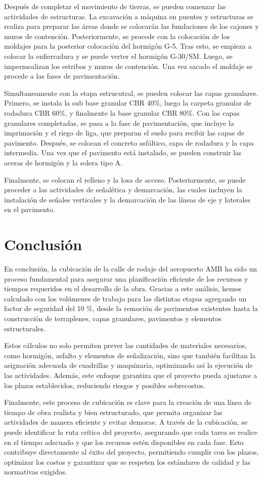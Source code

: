 \documentclass{article} %
\begin{document}
Después de completar el movimiento de tierras, se pueden comenzar las actividades de estructuras. La excavación a máquina en puentes y estructuras se realiza para preparar las áreas donde se colocarán las fundaciones de los cajones y muros de contención. Posteriormente, se procede con la colocación de los moldajes para la posterior colocación del hormigón G-5. Tras esto, se empieza a colocar la enfierradura y se puede verter el hormigón G-30/SM. Luego, se impermealizan los estribos y muros de contención. Una vez sacado el moldaje se procede a las fases de pavimentación.

Simultaneamente con la etapa estrucutral, se pueden colocar las capas granulares. Primero, se instala la sub base granular CBR 40\%, luego la carpeta granular de rodadura CBR 60\%, y finalmente la base granular CBR 80\%. Con las capas granulares completadas, se pasa a la fase de pavimentación, que incluye la imprimación y el riego de liga, que preparan el suelo para recibir las capas de pavimento. Después, se colocan el concreto asfáltico, capa de rodadura y la capa intermedia. Una vez que el pavimento está instalado, se pueden construir las aceras de hormigón y la solera tipo A.

Finalmente, se colocan el relleno y la losa de acceso. Posteriormente, se puede proceder a las actividades de señalética y demarcación, las cuales incluyen la instalación de señales verticales y la demarcación de las líneas de eje y laterales en el pavimento.

\newpage
\section{Conclusión}

En conclusión, la cubicación de la calle de rodaje del aeropuerto AMB ha sido un proceso fundamental para asegurar una planificación eficiente de los recursos y tiempos requeridos en el desarrollo de la obra. Gracias a este análisis, hemos calculado con los volúmenes de trabajo para las distintas etapas agregando un factor de seguridad del 10 \%, desde la remoción de pavimentos existentes hasta la construcción de terraplenes, capas granulares, pavimentos y elementos estructurales.

Estos cálculos no solo permiten prever las cantidades de materiales necesarios, como hormigón, asfalto y elementos de señalización, sino que también facilitan la asignación adecuada de cuadrillas y maquinaria, optimizando así la ejecución de las actividades. Además, este enfoque garantiza que el proyecto pueda ajustarse a los plazos establecidos, reduciendo riesgos y posibles sobrecostos.

Finalmente, este proceso de cubicación es clave para la creación de una línea de tiempo de obra realista y bien estructurado, que permita organizar las actividades de manera eficiente y evitar demoras. A través de la cubicación, se puede identificar la ruta crítica del proyecto, asegurando que cada tarea se realice en el tiempo adecuado y que los recursos estén disponibles en cada fase. Esto contribuye directamente al éxito del proyecto, permitiendo cumplir con los plazos, optimizar los costos y garantizar que se respeten los estándares de calidad y las normativas exigidas.
\end{document}
